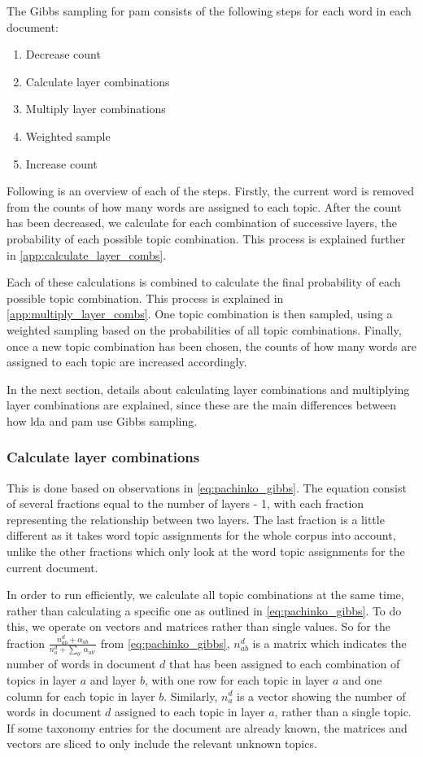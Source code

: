 The Gibbs sampling for \gls{pam} consists of the following steps for each word in each document:

\begin{enumerate}
	\item Decrease count
	\item Calculate layer combinations
	\item Multiply layer combinations
	\item Weighted sample
	\item Increase count
\end{enumerate}

Following is an overview of each of the steps.
Firstly, the current word is removed from the counts of how many words are assigned to each topic.
After the count has been decreased, we calculate for each combination of successive layers, the probability of each possible topic combination.
This process is explained further in \autoref{app:calculate_layer_combs}.

Each of these calculations is combined to calculate the final probability of each possible topic combination.
This process is explained in \autoref{app:multiply_layer_combs}.
One topic combination is then sampled, using a weighted sampling based on the probabilities of all topic combinations.
Finally, once a new topic combination has been chosen, the counts of how many words are assigned to each topic are increased accordingly.

In the next section, details about calculating layer combinations and multiplying layer combinations are explained, since these are the main differences between how \gls{lda} and \gls{pam} use Gibbs sampling.
\subsubsection{Calculate layer combinations}\label{app:calculate_layer_combs}
This is done based on observations in \autoref{eq:pachinko_gibbs}.
The equation consist of several fractions equal to the number of layers - 1, with each fraction representing the relationship between two layers.
The last fraction is a little different as it takes word topic assignments for the whole corpus into account, unlike the other fractions which only look at the word topic assignments for the current document.

In order to run efficiently, we calculate all topic combinations at the same time, rather than calculating a specific one as outlined in \autoref{eq:pachinko_gibbs}.
To do this, we operate on vectors and matrices rather than single values.
So for the fraction $\frac{n_{ab}^d + \alpha_{ab}}{n_a^d + \sum_{b'} \alpha_{ab'}}$ from \autoref{eq:pachinko_gibbs}, $n_{ab}^d$ is a matrix which indicates the number of words in document $d$ that has been assigned to each combination of topics in layer $a$ and layer $b$, with one row for each topic in layer $a$ and one column for each topic in layer $b$.
Similarly, $n_a^d$ is a vector showing the number of words in document $d$ assigned to each topic in layer $a$, rather than a single topic.
If some taxonomy entries for the document are already known, the matrices and vectors are sliced to only include the relevant unknown topics.

